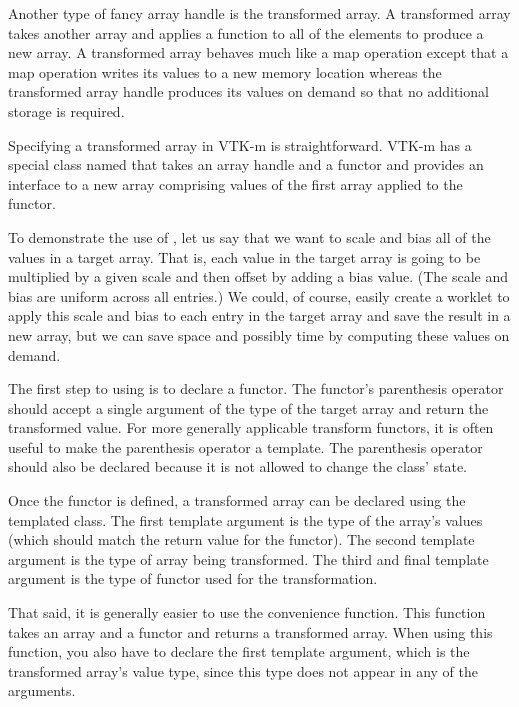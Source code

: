 Another type of fancy array handle is the transformed array. A transformed
array takes another array and applies a function to all of the elements to
produce a new array. A transformed array behaves much like a map operation
except that a map operation writes its values to a new memory location
whereas the transformed array handle produces its values on demand so that
no additional storage is required.

Specifying a transformed array in VTK-m is straightforward. VTK-m has a
special class named  that takes an array
handle and a functor and provides an interface to a new array comprising
values of the first array applied to the functor.

To demonstrate the use of , let us say
that we want to scale and bias all of the values in a target array. That
is, each value in the target array is going to be multiplied by a given
scale and then offset by adding a bias value. (The scale and bias are
uniform across all entries.) We could, of course, easily create a worklet
to apply this scale and bias to each entry in the target array and save the
result in a new array, but we can save space and possibly time by computing
these values on demand.

The first step to using  is to declare
a functor. The functor's parenthesis operator should accept a single
argument of the type of the target array and return the transformed value.
For more generally applicable transform functors, it is often useful to
make the parenthesis operator a template. The parenthesis operator should
also be declared  because it is not allowed to change the
class' state.


Once the functor is defined, a transformed array can be declared using the
templated  class. The first template
argument is the type of the array's values (which should match the return
value for the functor). The second template argument is the type of array
being transformed. The third and final template argument is the type of
functor used for the transformation.

That said, it is generally easier to use the
 convenience function. This function
takes an array and a functor and returns a transformed array. When using
this function, you also have to declare the first template argument, which
is the transformed array's value type, since this type does not appear in
any of the arguments.


